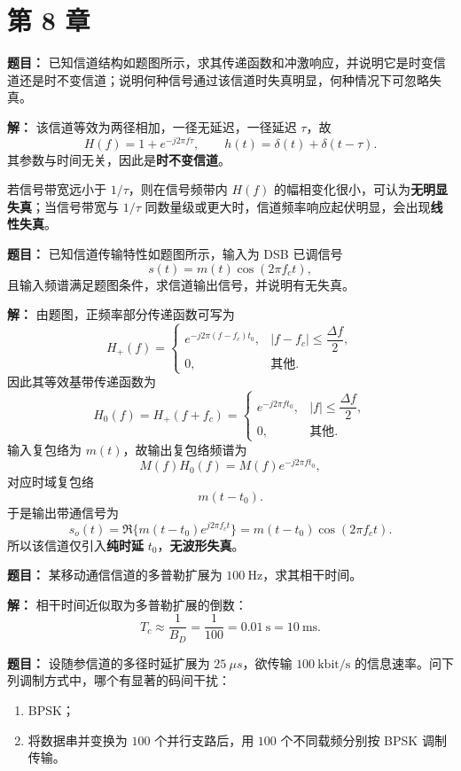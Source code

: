 \section*{第 8 章}

\textbf{题目：}
已知信道结构如题图所示，求其传递函数和冲激响应，并说明它是时变信道还是时不变信道；说明何种信号通过该信道时失真明显，何种情况下可忽略失真。

\par\textbf{解：}
该信道等效为两径相加，一径无延迟，一径延迟 $\tau$，故
\[
H(f)=1+e^{-j2\pi f\tau},
\qquad
h(t)=\delta(t)+\delta(t-\tau).
\]
其参数与时间无关，因此是\textbf{时不变信道}。

若信号带宽远小于 $1/\tau$，则在信号频带内 $H(f)$ 的幅相变化很小，可认为\textbf{无明显失真}；当信号带宽与 $1/\tau$ 同数量级或更大时，信道频率响应起伏明显，会出现\textbf{线性失真}。

\medskip
{}
\textbf{题目：}
已知信道传输特性如题图所示，输入为 DSB 已调信号
\[
s(t)=m(t)\cos(2\pi f_ct),
\]
且输入频谱满足题图条件，求信道输出信号，并说明有无失真。

\par\textbf{解：}
由题图，正频率部分传递函数可写为
\[
H_+(f)=
\begin{cases}
e^{-j2\pi(f-f_c)t_0}, & |f-f_c|\le \dfrac{\Delta f}{2},\\[4pt]
0, & \text{其他}.
\end{cases}
\]
因此其等效基带传递函数为
\[
H_0(f)=H_+(f+f_c)=
\begin{cases}
e^{-j2\pi f t_0}, & |f|\le \dfrac{\Delta f}{2},\\[4pt]
0, & \text{其他}.
\end{cases}
\]
输入复包络为 $m(t)$，故输出复包络频谱为
\[
M(f)H_0(f)=M(f)e^{-j2\pi f t_0},
\]
对应时域复包络
\[
m(t-t_0).
\]
于是输出带通信号为
\[
s_o(t)=\Re\{m(t-t_0)e^{j2\pi f_ct}\}=m(t-t_0)\cos(2\pi f_ct).
\]
所以该信道仅引入\textbf{纯时延} $t_0$，\textbf{无波形失真}。

\medskip
{}
\textbf{题目：}
某移动通信信道的多普勒扩展为 $100\ \text{Hz}$，求其相干时间。

\par\textbf{解：}
相干时间近似取为多普勒扩展的倒数：
\[
T_c\approx \frac{1}{B_D}=\frac{1}{100}=0.01\ \text{s}=10\ \text{ms}.
\]

\medskip
{}
\textbf{题目：}
设随参信道的多径时延扩展为 $25\ \mu s$，欲传输 $100\ \text{kbit/s}$ 的信息速率。问下列调制方式中，哪个有显著的码间干扰：
\begin{enumerate}
\item BPSK；
\item 将数据串并变换为 $100$ 个并行支路后，用 $100$ 个不同载频分别按 BPSK 调制传输。
\end{enumerate}

